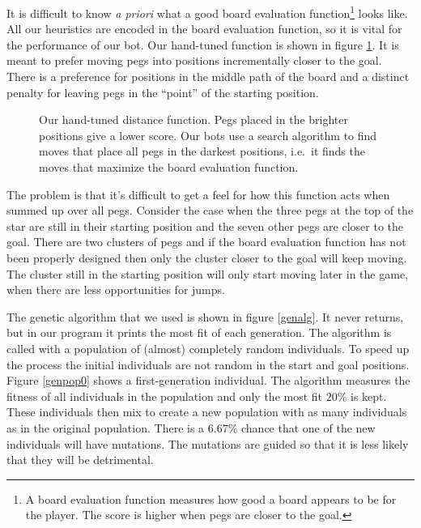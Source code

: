 \documentclass[a4paper,11pt]{article}
\begin{document}
It is difficult to know \emph{a priori} what a good board evaluation
function\footnote{A board evaluation function measures how good a
  board appears to be for the player. The score is higher when pegs
  are closer to the goal.} looks like. All our heuristics are encoded
in the board evaluation function, so it is vital for the performance
of our bot. Our hand-tuned function is shown in figure
\ref{handtuned}. It is meant to prefer moving pegs into positions
incrementally closer to the goal. There is a preference for positions
in the middle path of the board and a distinct penalty for leaving
pegs in the ``point'' of the starting position.

\begin{figure}
\centering

\caption{Our hand-tuned distance function. Pegs placed in the brighter
  positions give a lower score. Our bots use a search algorithm to
  find moves that place all pegs in the darkest positions, i.e.~it
  finds the moves that maximize the board evaluation function.}
\label{handtuned}
\end{figure}

The problem is that it's difficult to get a feel for how this function
acts when summed up over all pegs. Consider the case when the three
pegs at the top of the star are still in their starting position and
the seven other pegs are closer to the goal. There are two clusters of
pegs and if the board evaluation function has not been properly
designed then only the cluster closer to the goal will keep moving.
The cluster still in the starting position will only start moving
later in the game, when there are less opportunities for jumps.

The genetic algorithm that we used is shown in figure \ref{genalg}. It
never returns, but in our program it prints the most fit of each
generation. The algorithm is called with a population of (almost)
completely random individuals. To speed up the process the initial
individuals are not random in the start and goal positions. Figure
\ref{genpop0} shows a first-generation individual. The algorithm
measures the fitness of all individuals in the population and only the
most fit $20\%$ is kept. These individuals then mix to create a new
population with as many individuals as in the original population.
There is a $6.67\%$ chance that one of the new individuals will have
mutations. The mutations are guided so that it is less likely that
they will be detrimental.
\end{document}
